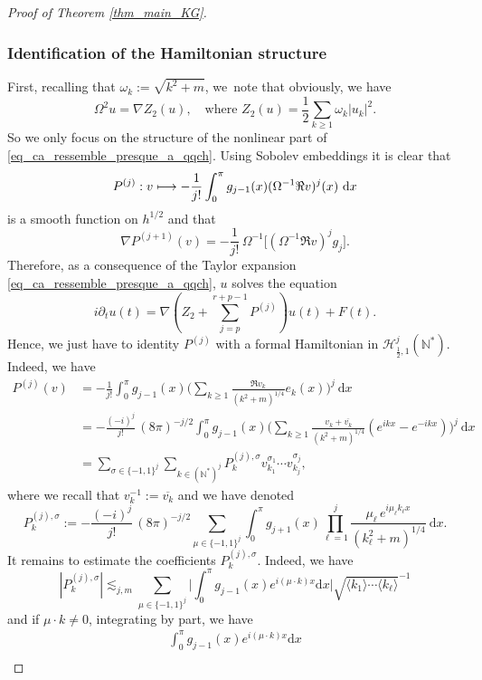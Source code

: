\documentclass[JEP,XML,SOM,Unicode,NoEqCountersInSection,published]{cedram}
\newcommand\mto{\mathchoice{\longmapsto}{\mapsto}{\mapsto}{\mapsto}}
\theoremstyle{definition}
\begin{document}
\begin{proof}[Proof of Theorem \ref{thm_main_KG}]
\subsubsection*{Identification of the Hamiltonian structure}
First, recalling that $\omega_k:= \sqrt{k^2+m}$, we~note that obviously, we have
\[
\Omega^2 u = \nabla Z_2(u), \quad \text{where } Z_2(u) = \frac12 \sum_{k\geq 1} \omega_k |u_k|^2.
\]
So we only focus on the structure of the nonlinear part of \eqref{eq_ca_ressemble_presque_a_qqch}. Using Sobolev embed\-dings it is clear that
\[
P^{(j)}: v\mto - \frac1{j !}\int_0^\pi g_{j-1}(x) (\Omega^{-1} \Re v)^j(x) \ \mathrm{d}x
\]
is a smooth function on $h^{1/2}$ and that
\[
\nabla P^{(j+1)}(v) = - \frac1{j !}\, \Omega^{-1}\bigl[(\Omega^{-1} \Re v)^j g_j\bigr].
\]
Therefore, as a consequence of the Taylor expansion \eqref{eq_ca_ressemble_presque_a_qqch}, $u$ solves the equation
\begin{equation}
\label{eq_ca_ressemble_a_ca}
i\partial_t u(t) = \nabla (Z_2 + \sum_{j=p}^{r+p-1} P^{(j)}) u(t) + F(t).
\end{equation}
Hence, we just have to identity $P^{(j)}$ with a formal Hamiltonian in $\mathscr{H}_{\frac12,1}^j(\mathbb{N}^*)$.
Indeed, we have
\begin{align*}
P^{(j)}(v) &= -\frac1{j !}\int_0^\pi g_{j-1}(x) \biggl(\sum_{k\geq 1} \frac{\Re v_k }{(k^2+m)^{1/4}} e_k(x) \biggr)^j \ \mathrm{d}x \\
&= -\frac{(-i)^j}{j !}\, (8\pi)^{-j/2} \int_0^\pi g_{j-1}(x) \biggl(\sum_{k\geq 1} \frac{v_k + \overline{v_k}}{(k^2+m)^{1/4}} (e^{ikx} - e^{-ikx})\biggr)^j \ \mathrm{d}x \\
&= \sum_{\sigma\in \{-1,1\}^j} \sum_{k\in (\mathbb{N}^*)^j} P^{(j),\sigma}_k v_{k_1}^{\sigma_1} \cdots v_{k_j}^{\sigma_j},
\end{align*}
where we recall that $v_k^{-1}:= \overline{v_k}$ and we have denoted
\[
P^{(j),\sigma}_k:= -\frac{(-i)^j}{j !}\, (8\pi)^{-j/2} \sum_{\mu \in \{-1,1\}^j} \int_0^\pi g_{j+1}(x) \prod_{\ell=1}^j \frac{\mu_{\ell}\, e^{i\mu_{\ell}k_{\ell}x}}{(k_\ell^2+m)^{1/4}} \ \mathrm{d}x.
\]
It remains to estimate the coefficients $P^{(j),\sigma}_k$. Indeed, we have
\[
|P^{(j),\sigma}_k| \lesssim_{j,m} \sum_{\mu \in \{-1,1\}^j} \biggl| \int_0^\pi g_{j-1}(x) e^{i(\mu \cdot k) x} \mathrm{d}x \biggr| \sqrt{ \langle k_1 \rangle \cdots \langle k_\ell \rangle }^{-1}
\]
and if $\mu \cdot k \neq 0$, integrating by part, we have
\begin{multline*}
\int_0^\pi g_{j-1}(x) e^{i(\mu \cdot k) x} \mathrm{d}x\\[-8pt]

\end{multline*}
\end{proof}
\end{document}
